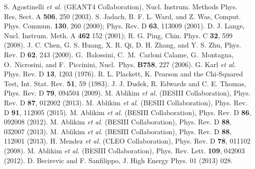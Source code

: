 \documentclass[prd,twocolumn,showpacs,amsmath,amssymb]{revtex4-1}
\begin{document}
\begin{thebibliography}{99}
S. Agostinelli {\it et al.} (GEANT4 Collaboration), Nucl. Instrum. Methods Phys. Res, Sect. A \textbf{506}, 250 (2003).
S. Jadach, B. F. L. Ward, and Z. Was, Comput. Phys. Commun. \textbf{130}, 260 (2000); Phys. Rev. D \textbf{63}, 113009 (2001).
D. J. Lange, Nucl. Instrum. Meth. A \textbf{462} 152 (2001); R. G. Ping, Chin. Phys. C \textbf{32}, 599 (2008).
J. C. Chen, G. S. Huang, X. R. Qi, D. H. Zhang, and Y. S. Zhu, Phys. Rev. D \textbf{62}, 243 (2000).
G.~Balossini, C.~M.~Carloni Calame, G.~Montagna, O.~Nicrosini, and F.~Piccinini, Nucl.\ Phys. \textbf{B758}, 227 (2006).
G. Karl {\it et al.} Phys. Rev. D \textbf{13}, 1203 (1976).
R. L. Plackett, K. Pearson and the Chi-Squared Test, Int. Stat. Rev. \textbf{51}, 59 (1983).
J. J. Dudek, R. Edwards and C. E. Thomas, Phys. Rev. D \textbf{79}, 094504 (2009).
M. Ablikim {\it et al.} (BESIII Collaboration), Phys. Rev. D \textbf{87}, 012002 (2013).
M. Ablikim {\it et al.} (BESIII Collaboration), Phys. Rev. D \textbf{91}, 112005 (2015).
M. Ablikim {\it et al.} (BESIII Collaboration), Phys. Rev. D \textbf{86}, 092008 (2012).
M. Ablikim {\it et al.} (BESIII Collaboration), Phys. Rev. D \textbf{88}, 032007 (2013).
M. Ablikim {\it et al.} (BESIII Collaboration), Phys. Rev. D \textbf{88}, 112001 (2013).
H. Mendez {\it et al.} (CLEO Collaboration), Phys. Rev. D \textbf{78}, 011102 (2008).
M. Ablikim {\it et al.} (BESIII Collaboration), Phys. Rev. Lett. \textbf{109}, 042003 (2012).
D. Becirevic and F. Sanfilippo,  J. High Energy Phys. 01 (2013) 028.
\end{thebibliography}
\end{document}
